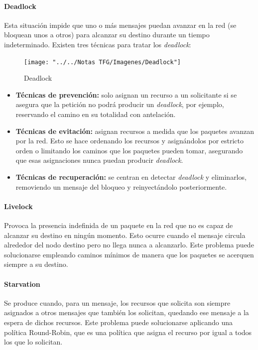 \paragraph{Deadlock}
Esta situación impide que uno o más mensajes puedan avanzar en la red (se bloquean unos a otros) para alcanzar su destino durante un tiempo indeterminado. Existen tres técnicas para tratar los \textit{deadlock}:

\begin{figure}[H]
	\centering
	\texttt{[image: "../../Notas TFG/Imagenes/Deadlock"]}
	\caption{Deadlock}
	\label{fig:deadlock}
\end{figure}

\begin{itemize}
	\item \textbf{Técnicas de prevención:} solo asignan un recurso a un solicitante si se asegura que la petición no podrá producir un \textit{deadlock}, por ejemplo, reservando el camino en su totalidad con antelación.
	\item \textbf{Técnicas de evitación:} asignan recursos a medida que los paquetes avanzan por la red. Esto se hace ordenando los recursos y asignándolos por estricto orden o limitando los caminos que los paquetes pueden tomar, asegurando que esas asignaciones nunca puedan producir \textit{deadlock}. 
	\item \textbf{Técnicas de recuperación:} se centran en detectar \textit{deadlock} y eliminarlos, removiendo un mensaje del bloqueo y reinyectándolo posteriormente.
\end{itemize}

\paragraph{Livelock}
Provoca la presencia indefinida de un paquete en la red que no es capaz de alcanzar su destino en ningún momento. Esto ocurre cuando el mensaje circula alrededor del nodo destino pero no llega nunca a alcanzarlo. Este problema puede solucionarse empleando caminos mínimos de manera que los paquetes se acerquen siempre a su destino.

\paragraph{Starvation}
Se produce cuando, para un mensaje, los recursos que solicita son siempre asignados a otros mensajes que también los solicitan, quedando ese mensaje a la espera de dichos recursos. Este problema puede solucionarse aplicando una política Round-Robin, que es una política que asigna el recurso por igual a todos los que lo solicitan.

